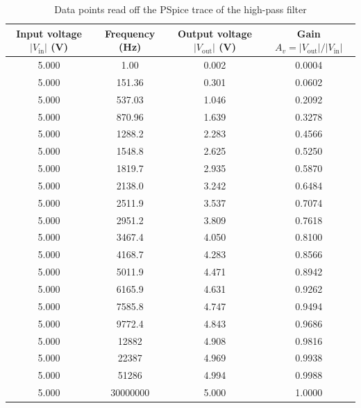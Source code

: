 \documentclass[12pt,a4paper]{article}
\begin{document}
	\begin{table}[H]
		\centering
		\caption{Data points read off the PSpice trace of the high-pass filter}
		\label{tab:data2}
		\small
		\renewcommand{\arraystretch}{1.2}
		\begin{tabular}{|c|c|c|c|}
			\hline
			\rowcolor{black!12}\textbf{Input voltage $|V_{\mathrm{in}}|$ (V)} & \textbf{Frequency (Hz)} & \textbf{Output voltage $|V_{\mathrm{out}}|$ (V)} & \textbf{Gain $A_v = |V_{\mathrm{out}}|/|V_{\mathrm{in}}|$} \\
			\hline
			\num{5.000} & \num{1.00} & \num{0.002} & \num{0.0004}\\
			\hline
			\num{5.000} & \num{151.36} & \num{0.301} & \num{0.0602}\\
			\hline
			\num{5.000} & \num{537.03} & \num{1.046} & \num{0.2092}\\
			\hline
			\num{5.000} & \num{870.96} & \num{1.639} & \num{0.3278}\\
			\hline
			\num{5.000} & \num{1288.2} & \num{2.283} & \num{0.4566}\\
			\hline
			\num{5.000} & \num{1548.8} & \num{2.625} & \num{0.5250}\\
			\hline
			\num{5.000} & \num{1819.7} & \num{2.935} & \num{0.5870}\\
			\hline
			\num{5.000} & \num{2138.0} & \num{3.242} & \num{0.6484}\\
			\hline
			\num{5.000} & \num{2511.9} & \num{3.537} & \num{0.7074}\\
			\hline
			\num{5.000} & \num{2951.2} & \num{3.809} & \num{0.7618}\\
			\hline
			\num{5.000} & \num{3467.4} & \num{4.050} & \num{0.8100}\\
			\hline
			\num{5.000} & \num{4168.7} & \num{4.283} & \num{0.8566}\\
			\hline
			\num{5.000} & \num{5011.9} & \num{4.471} & \num{0.8942}\\
			\hline
			\num{5.000} & \num{6165.9} & \num{4.631} & \num{0.9262}\\
			\hline
			\num{5.000} & \num{7585.8} & \num{4.747} & \num{0.9494}\\
			\hline
			\num{5.000} & \num{9772.4} & \num{4.843} & \num{0.9686}\\
			\hline
			\num{5.000} & \num{12882} & \num{4.908} & \num{0.9816}\\
			\hline
			\num{5.000} & \num{22387} & \num{4.969} & \num{0.9938}\\
			\hline
			\num{5.000} & \num{51286} & \num{4.994} & \num{0.9988}\\
			\hline
			\num{5.000} & \num{30000000} & \num{5.000} & \num{1.0000} \\
			\hline
		\end{tabular}
	\end{table}
\end{document}
